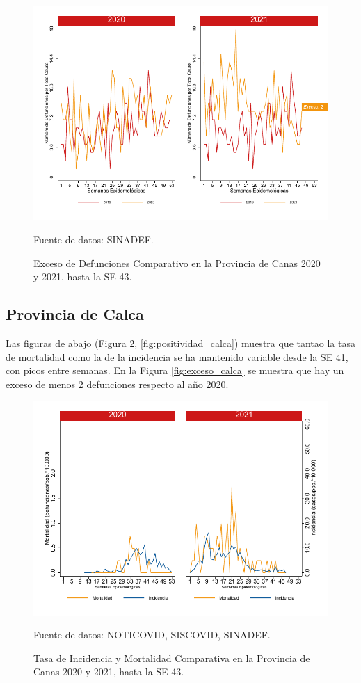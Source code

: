 \documentclass[12pt,a4paper,openany]{book}
\begin{document}
		\begin{figure}[h]
			\caption{Exceso de Defunciones Comparativo en la Provincia de Canas 2020 y 2021, hasta la SE 43.}\label{fig:exceso_canas}
			\begin{center}
				\includegraphics[width=0.7\linewidth]{../figuras/exceso_3}
			\end{center}
			{\footnotesize {Fuente de datos: SINADEF.}}
		\end{figure}
		
		\clearpage
		
		\subsection*{Provincia de Calca}
		\noindent Las figuras de abajo (Figura \ref{fig:inc_mort_calca}, \ref{fig:positividad_calca}) muestra que tantao la tasa de mortalidad como la de la incidencia se ha mantenido variable desde la SE 41, con picos entre semanas. En la Figura \ref{fig:exceso_calca} se muestra que hay un exceso de menos 2 defunciones respecto al año 2020.
		
		\begin{figure}[h]
			\caption{Tasa de Incidencia y Mortalidad Comparativa en la Provincia de Canas 2020 y 2021, hasta la SE 43.}\label{fig:inc_mort_calca}
			\begin{center}
				\includegraphics[width=0.7\linewidth]{../figuras/incidencia_mortalidad_20_21_4}
			\end{center}
			{\footnotesize {Fuente de datos: NOTICOVID, SISCOVID, SINADEF.}}
		\end{figure}
		
\end{document}
